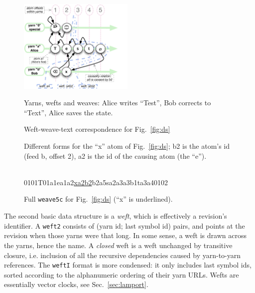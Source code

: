 \documentclass{sig-alternate}
\begin{document}
\begin{figure}[t]
\includegraphics[width=0.49\textwidth]{feedsnweaves-5.pdf}
\caption{Yarns, wefts and weaves: Alice writes ``Test'', Bob corrects to ``Text'', Alice saves the state. \label{fig:ds} }

\caption{Weft-weave-text correspondence for Fig.~\ref{fig:ds} \label{fig:wwt}}

\caption {Different forms for the ``x'' atom of Fig.~\ref{fig:ds}; b2 is the atom's id (feed b, offset 2), a2 is the id of the causing atom (the ``e''). \label{fig:forms}}
~\\
{ {\aum}0101{T}01a1{e}a1a2{\underline{xa2b2}}{\zero}b2a5{s}a2a3{\bsp}a3b1{t}a3a4{\eoa}0102 }
\caption{ Full {\tt weave5c} for Fig.~\ref{fig:ds} (``x'' is underlined). \label{fig:w5c} }
\end{figure}
The second basic data structure is a \emph{weft}, which is effectively a revision's identifier.
A {\tt weft2} consists of (yarn id; last symbol id) pairs, and points at the revision when those yarns were that long. 
In some sense, a weft is drawn across the yarns, hence the name.
A \emph{closed} weft is a weft unchanged by transitive closure, i.e. inclusion of all the recursive dependencies caused by yarn-to-yarn references.
The {\tt weftI} format is more condensed: it only includes last symbol ids, sorted according to the alphanumeric ordering of their yarn URLs.
Wefts are essentially vector clocks, see Sec.~\ref{sec:lamport}.
\end{document}
